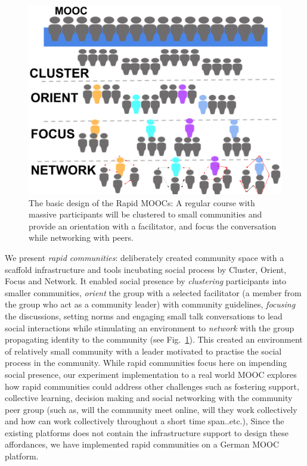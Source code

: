 \documentclass[manuscript,screen,review]{acmart}
\begin{document}
\begin{figure}[h]
  \centering
  \includegraphics[width=\linewidth]{images/Framework.png}
  \caption{The basic design of the Rapid MOOCs: A regular course with massive participants will be clustered to small communities and provide an orientation with a facilitator, and focus the conversation while networking with peers.}
 \label{fig:framework}
\end{figure}

We present \textit{rapid communities}: deliberately created community space with a scaffold infrastructure and tools incubating social process by Cluster, Orient, Focus and Network. It enabled social presence by \textit{clustering} participants into smaller communities, \textit{orient} the group with a selected facilitator (a member from the group who act as a community leader) with community guidelines, \textit{focusing} the discussions, setting norms and engaging small talk conversations to lead social interactions while stimulating an environment to \textit{network} with the group propagating identity to the community (see Fig.~\ref{fig:framework}). This created an environment of relatively small community with a leader motivated to practise the social process in the community. While rapid communities focus here on impending social presence, our experiment implementation to a real world MOOC explores how rapid communities could address other challenges such as fostering support, collective learning, decision making and social networking with the community peer group (such as,  will the community meet online, will they work collectively and how can work collectively throughout a short time span..etc.), Since the existing platforms does not contain the infrastructure support to design these affordances, we have implemented rapid communities on a German MOOC platform.
\end{document}
